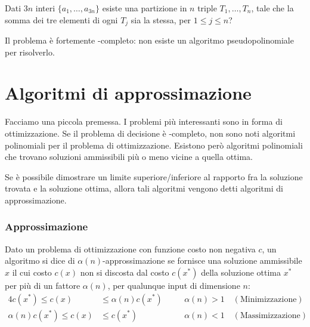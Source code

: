 Dati \(3n\) interi \(\{a_1, \dots, a_{3n}\}\) esiste una partizione in \(n\) triple \(T_1, \dots, T_n\), tale che la somma dei tre elementi di ogni \(T_j\) sia la stessa, per \(1 \leqslant j \leqslant n\)?

\begin{note}
Il problema {\treePartition} è fortemente \NP-completo: non esiste un algoritmo pseudopolinomiale per risolverlo.
\end{note}

\section{Algoritmi di approssimazione}

Facciamo una piccola premessa.
I problemi più interessanti sono in forma di ottimizzazione.
Se il problema di decisione è \NP-completo, non sono noti algoritmi polinomiali per il problema di ottimizzazione.
Esistono però algoritmi polinomiali che trovano soluzioni ammissibili più o meno vicine a quella ottima.

\begin{definition*}
Se è possibile dimostrare un limite superiore/inferiore al rapporto fra la soluzione trovata e la soluzione ottima, allora tali algoritmi vengono detti \alert{algoritmi di approssimazione}.
\end{definition*}

\subsubsection*{Approssimazione}

\begin{definition*}
Dato un problema di ottimizzazione con funzione costo non negativa \(c\), un algoritmo si dice di \alert{\(\alpha(n)\)-approssimazione} se fornisce una soluzione ammissibile \(x\) il cui costo \(c(x)\) non si discosta dal costo \(c(x^*)\) della soluzione ottima \(x^*\) per più di un fattore \(\alpha(n)\), per qualunque input di dimensione \(n\):
\begin{alignat*}{4}
	c(x^*) \leqslant c(x)           &\leqslant \alpha(n) c(x^*) &\quad& \alpha(n) > 1 \quad (\text{Minimizzazione})\\
	\alpha(n) c(x^*) \leqslant c(x) &\leqslant c(x^*)           &\quad& \alpha(n) < 1 \quad (\text{Massimizzazione})
\end{alignat*}
\end{definition*}

